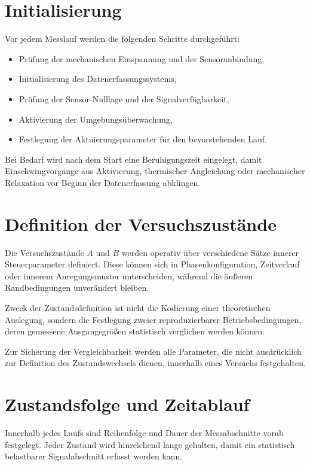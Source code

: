 \documentclass[12pt,a4paper]{report}
\begin{document}
\section{Initialisierung}

Vor jedem Messlauf werden die folgenden Schritte durchgeführt:

\begin{itemize}
\item Prüfung der mechanischen Einspannung und der Sensoranbindung,
\item Initialisierung des Datenerfassungssystems,
\item Prüfung der Sensor-Nulllage und der Signalverfügbarkeit,
\item Aktivierung der Umgebungsüberwachung,
\item Festlegung der Aktuierungsparameter für den bevorstehenden Lauf.
\end{itemize}

Bei Bedarf wird nach dem Start eine Beruhigungszeit eingelegt, damit
Einschwingvorgänge aus Aktivierung, thermischer Angleichung oder
mechanischer Relaxation vor Beginn der Datenerfassung abklingen.

\section{Definition der Versuchszustände}

Die Versuchszustände $A$ und $B$ werden operativ über verschiedene Sätze
innerer Steuerparameter definiert. Diese können sich in
Phasenkonfiguration, Zeitverlauf oder innerem Anregungsmuster
unterscheiden, während die äußeren Randbedingungen unverändert bleiben.

Zweck der Zustandsdefinition ist nicht die Kodierung einer theoretischen
Auslegung, sondern die Festlegung zweier reproduzierbarer
Betriebsbedingungen, deren gemessene Ausgangsgrößen statistisch
verglichen werden können.

Zur Sicherung der Vergleichbarkeit werden alle Parameter, die nicht
ausdrücklich zur Definition des Zustandswechsels dienen, innerhalb eines
Versuchs festgehalten.

\section{Zustandsfolge und Zeitablauf}

Innerhalb jedes Laufs sind Reihenfolge und Dauer der Messabschnitte
vorab festgelegt. Jeder Zustand wird hinreichend lange gehalten, damit
ein statistisch belastbarer Signalabschnitt erfasst werden kann.
\end{document}
